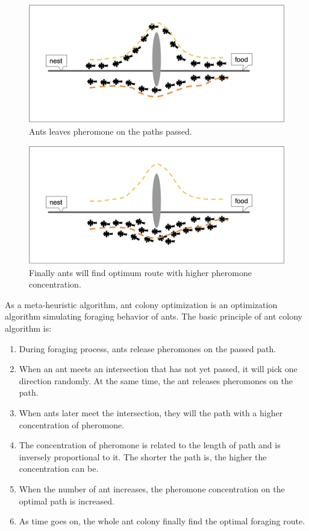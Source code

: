 \documentclass[senior]{IPSstyle}
\begin{document}
\begin{figure}[h]
    \centering
    \includegraphics[width=15cm]{MasterThesis-master/ACO-2.png}
    \caption{Ants leaves pheromone on the paths passed.}
    \label{fig:my_label1}
\end{figure}

\begin{figure}[h]
    \centering
    \includegraphics[width=15cm]{MasterThesis-master/ACO-3.png}
    \caption{Finally ants will find optimum route with higher pheromone concentration.}
    \label{fig:my_label2}
\end{figure}

As a meta-heuristic algorithm, ant colony optimization is an optimization algorithm simulating foraging behavior of ants. The basic principle of ant colony algorithm is:
\begin{enumerate}
    \item During foraging process, ants release pheromones on the passed path.
    \item When an ant meets an intersection that has not yet passed, it will pick one direction randomly. At the same time, the ant releases pheromones on the path.
    \item When ants later meet the intersection, they will the path with a higher concentration of pheromone.
    \item The concentration of pheromone is related to the length of path and is inversely proportional to it. The shorter the path is, the higher the concentration can be.
    \item When the number of ant increases, the pheromone concentration on the optimal path is increased.
    \item As time goes on, the whole ant colony finally find the optimal foraging route.
\end{enumerate}
\end{document}
